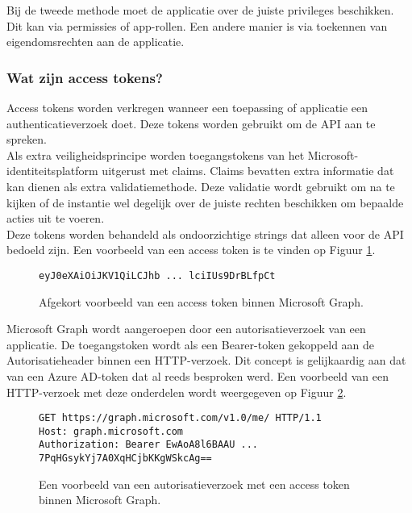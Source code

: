 Bij de tweede methode moet de applicatie over de juiste privileges beschikken. Dit kan via permissies of app-rollen. Een andere manier is via toekennen van eigendomsrechten aan de applicatie. 

\subsubsection{Wat zijn access tokens?}

Access tokens worden verkregen wanneer een toepassing of applicatie een authenticatieverzoek doet. Deze tokens worden gebruikt om de \ac{API} aan te spreken. \\

Als extra veiligheidsprincipe worden toegangstokens van het Microsoft-\newline
identiteitsplatform uitgerust met claims. Claims bevatten extra informatie dat kan dienen als extra validatiemethode. Deze validatie wordt gebruikt om na te kijken of de instantie wel degelijk over de juiste rechten beschikken om bepaalde acties uit te voeren. \\

Deze tokens worden behandeld als ondoorzichtige strings dat alleen voor de \ac{API} bedoeld zijn. Een voorbeeld van een access token is te vinden op Figuur \ref{MSGAT}. \\

\begin{figure}[h]
    \footnotesize\begin{verbatim}eyJ0eXAiOiJKV1QiLCJhb ... lciIUs9DrBLfpCt
\end{verbatim}    
    \caption[Afgekort voorbeeld Microsoft Graph access token]{Afgekort voorbeeld van een access token binnen Microsoft Graph.}
    \label{MSGAT}
\end{figure}

Microsoft Graph wordt aangeroepen door een autorisatieverzoek van een applicatie. De toegangstoken wordt als een Bearer-token gekoppeld aan de Autorisatieheader binnen een \ac{HTTP}-verzoek. Dit concept is gelijkaardig aan dat van een Azure \ac{AD}-token dat al reeds besproken werd. Een voorbeeld van een \ac{HTTP}-verzoek met deze onderdelen wordt weergegeven op Figuur \ref{MSGA}. \\

\begin{figure}[h]
    \footnotesize\begin{verbatim}GET https://graph.microsoft.com/v1.0/me/ HTTP/1.1
Host: graph.microsoft.com
Authorization: Bearer EwAoA8l6BAAU ... 7PqHGsykYj7A0XqHCjbKKgWSkcAg==
    \end{verbatim}    
    \caption[Voorbeeld Microsoft Graph Autorisatieverzoek]{Een voorbeeld van een autorisatieverzoek met een access token binnen Microsoft Graph.}
    \label{MSGA}
\end{figure}

